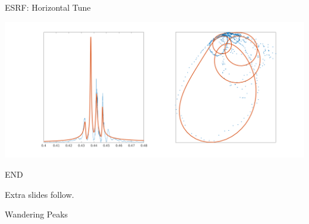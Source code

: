 \documentclass[aspectratio=169, xcolor=table]{beamer}
\begin{document}
%
\begin{frame}{ESRF: Horizontal Tune}

\includegraphics[width=\linewidth]{esrf-H.png}

\end{frame}


%
\begin{frame}{END}

\vfill
Extra slides follow.

\end{frame}


%
\begin{frame}{Wandering Peaks}

\quad
{}


\end{frame}
\end{document}
